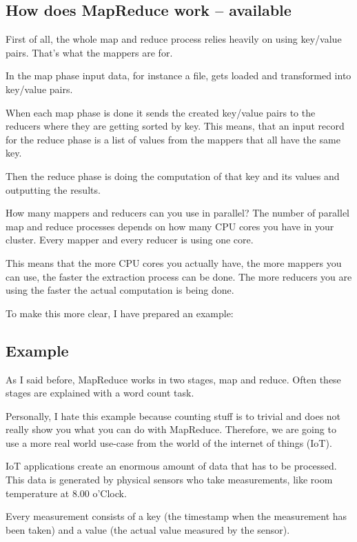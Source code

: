\documentclass[12pt, numbers=noenddot]{scrreprt} %
\begin{document}
\subsection{How does MapReduce work -- available}

First of all, the whole map and reduce process relies heavily on using key/value pairs. That’s what the mappers are for.

In the map phase input data, for instance a file, gets loaded and transformed into key/value pairs.

When each map phase is done it sends the created key/value pairs to the reducers where they are getting sorted by key. This means, that an input record for the reduce phase is a list of values from the mappers that all have the same key.

Then the reduce phase is doing the computation of that key and its values and outputting the results.

How many mappers and reducers can you use in parallel? The number of parallel map and reduce processes depends on how many CPU cores you have in your cluster. Every mapper and every reducer is using one core.

This means that the more CPU cores you actually have, the more mappers you can use, the faster the extraction process can be done. The more reducers you are using the faster the actual computation is being done.

To make this more clear, I have prepared an example:

\subsection{Example}
As I said before, MapReduce works in two stages, map and reduce. Often these stages are explained with a word count task.

Personally, I hate this example because counting stuff is to trivial and does not really show you what you can do with MapReduce. Therefore, we are going to use a more real world use-case from the world of the internet of things (IoT).

IoT applications create an enormous amount of data that has to be processed. This data is generated by physical sensors who take measurements, like room temperature at 8.00 o’Clock.

Every measurement consists of a key (the timestamp when the measurement has been taken) and a value (the actual value measured by the sensor).
\end{document}
